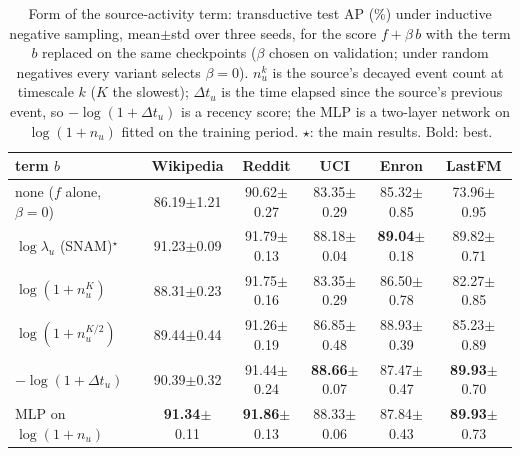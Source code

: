 \begin{table}[t]
\caption{Form of the source-activity term: transductive test AP (\%) under inductive negative sampling, mean{\tiny$\pm$std} over three seeds, for the score $f+\beta\,b$ with the term $b$ replaced on the same checkpoints ($\beta$ chosen on validation; under random negatives every variant selects $\beta=0$). $n_u^k$ is the source's decayed event count at timescale $k$ ($K$ the slowest); $\Delta t_u$ is the time elapsed since the source's previous event, so $-\log(1+\Delta t_u)$ is a recency score; the MLP is a two-layer network on $\log(1+n_u)$ fitted on the training period. $\star$: the main results. Bold: best.}
\label{tab:a3_transductive_inductive}
\centering
\scriptsize
\setlength{\tabcolsep}{2.5pt}
\renewcommand{\arraystretch}{0.9}
\begin{tabular}{lccccc}
\toprule
term $b$ & Wikipedia & Reddit & UCI & Enron & LastFM \\
\midrule
none ($f$ alone, $\beta=0$) & 86.19{\tiny$\pm$1.21} & 90.62{\tiny$\pm$0.27} & 83.35{\tiny$\pm$0.29} & 85.32{\tiny$\pm$0.85} & 73.96{\tiny$\pm$0.95} \\
$\log\lambda_u$ (SNAM)$^\star$ & 91.23{\tiny$\pm$0.09} & 91.79{\tiny$\pm$0.13} & 88.18{\tiny$\pm$0.04} & \textbf{89.04}{\tiny$\pm$0.18} & 89.82{\tiny$\pm$0.71} \\
\midrule
$\log(1+n_u^{K})$ & 88.31{\tiny$\pm$0.23} & 91.75{\tiny$\pm$0.16} & 83.35{\tiny$\pm$0.29} & 86.50{\tiny$\pm$0.78} & 82.27{\tiny$\pm$0.85} \\
$\log(1+n_u^{K/2})$ & 89.44{\tiny$\pm$0.44} & 91.26{\tiny$\pm$0.19} & 86.85{\tiny$\pm$0.48} & 88.93{\tiny$\pm$0.39} & 85.23{\tiny$\pm$0.89} \\
$-\log(1+\Delta t_u)$ & 90.39{\tiny$\pm$0.32} & 91.44{\tiny$\pm$0.24} & \textbf{88.66}{\tiny$\pm$0.07} & 87.47{\tiny$\pm$0.47} & \textbf{89.93}{\tiny$\pm$0.70} \\
MLP on $\log(1+n_u)$ & \textbf{91.34}{\tiny$\pm$0.11} & \textbf{91.86}{\tiny$\pm$0.13} & 88.33{\tiny$\pm$0.06} & 87.84{\tiny$\pm$0.43} & \textbf{89.93}{\tiny$\pm$0.73} \\
\bottomrule
\end{tabular}
\end{table}
